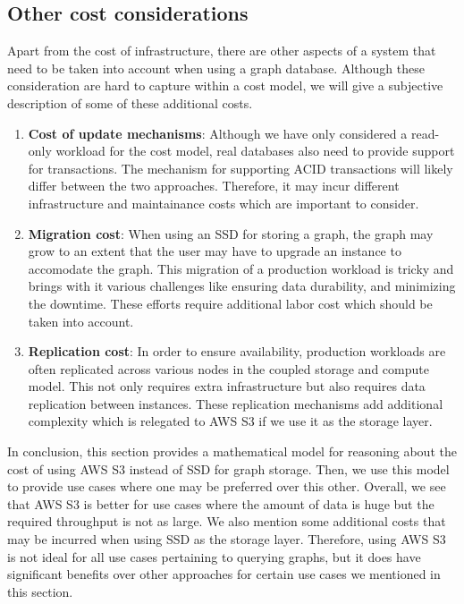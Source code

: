 \subsection{Other cost considerations}
Apart from the cost of infrastructure, there are other aspects of a system that
need to be taken into account when using a graph database. Although these
consideration are hard to capture within a cost model, we will give a subjective
description of some of these additional costs.
\begin{enumerate}
    \item \textbf{Cost of update mechanisms}: Although we have only considered a
        read-only workload for the cost model, real databases also need to
        provide support for transactions. The mechanism for supporting ACID
        transactions will likely differ between the two approaches. Therefore,
        it may incur different infrastructure and maintainance costs which are
        important to consider.
    \item \textbf{Migration cost}: When using an SSD for storing a graph, the
        graph may grow to an extent that the user may have to upgrade an
        instance to accomodate the graph. This migration of a production
        workload is tricky and brings with it various challenges like ensuring
        data durability, and minimizing the downtime. These efforts require
        additional labor cost which should be taken into account.
    \item \textbf{Replication cost}: In order to ensure availability, production
        workloads are often replicated across various nodes in the coupled
        storage and compute model. This not only requires extra infrastructure
        but also requires data replication between instances. These replication
        mechanisms add additional complexity which is relegated to AWS S3 if we
        use it as the storage layer.
\end{enumerate}

\medskip
In conclusion, this section provides a mathematical model for reasoning about
the cost of using AWS S3 instead of SSD for graph storage. Then, we use this
model to provide use cases where one may be preferred over this other. Overall,
we see that AWS S3 is better for use cases where the amount of data is huge but
the required throughput is not as large. We also mention some additional costs
that may be incurred when using SSD as the storage layer. Therefore, using AWS S3 is
not ideal for all use cases pertaining to querying graphs, but it does have
significant benefits over other approaches for certain use cases we mentioned in
this section.

